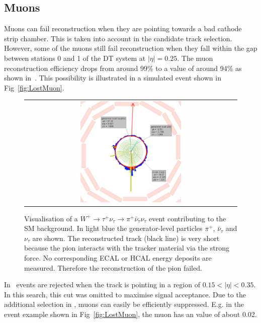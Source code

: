 \subsection*{Muons}
Muons can fail reconstruction when they are pointing towards a bad cathode strip chamber.
This is taken into account in the candidate track selection.
However, some of the muons still fail reconstruction when they fall within the gap between stations 0 and 1 of the DT system at $|\eta|=0.25$.
The muon reconstruction efficiency drops from around 99\% to a value of around 94\% as shown in~\cite{bib:CMS:DT_Thesis,bib:CMS:DT_8TeV_AN}.
This possibility is illustrated in a simulated event shown in Fig~\ref{fig:LostMuon}.
\begin{figure}[!tb]
  \centering 
  \begin{tabular}{c}
    \includegraphics[width=0.49\textwidth]{figures/analysis/LostTau_Lumi_60133_Event_24033837.png}
  \end{tabular}
  \caption{Visualisation of a $W^{+}\rightarrow \tau^{+}\nu_{\tau} \rightarrow \pi^{+}\bar{\nu}_{\tau} \nu_{\tau} $ event contributing to the SM background. 
           In light blue the generator-level particles $\pi^{+}$, $\bar{\nu}_{\tau}$ and $\nu_{\tau}$ are shown.
           The reconstructed track (black line) is very short because the pion interacts with the tracker material via the strong force.
           No corresponding ECAL or HCAL energy deposits are measured. Therefore the reconstruction of the pion failed.}
  \label{fig:LostTau}
\end{figure}

In~\cite{bib:CMS:DT_Thesis,bib:CMS:DT_8TeV_AN} events are rejected when the track is pointing in a region of $0.15<|\eta|<0.35$.
In this search, this cut was omitted to maximise signal acceptance. 
Due to the additional selection in \ias, muons can easily be efficiently suppressed.
E.g. in the event example shown in Fig~\ref{fig:LostMuon}, the muon has an \ias value of about 0.02.\\


